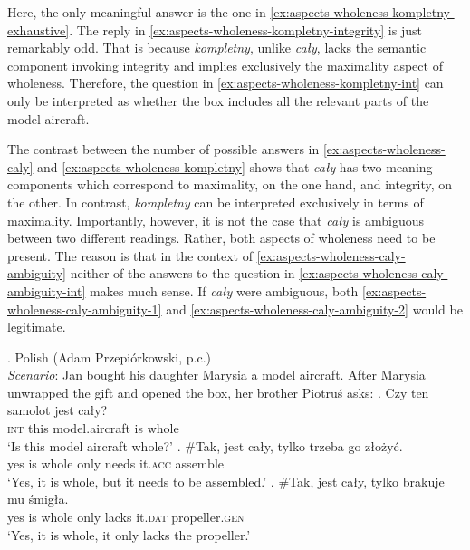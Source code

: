 Here, the only meaningful answer is the one in \ref{ex:aspects-wholeness-kompletny-exhaustive}. The reply in \ref{ex:aspects-wholeness-kompletny-integrity} is just remarkably odd. That is because \textit{kompletny}, unlike \textit{cały}, lacks the semantic component invoking integrity and implies exclusively the maximality aspect of wholeness. Therefore, the question in \ref{ex:aspects-wholeness-kompletny-int} can only be interpreted as whether the box includes all the relevant parts of the model aircraft. 

The contrast between the number of possible answers in \ref{ex:aspects-wholeness-caly} and \ref{ex:aspects-wholeness-kompletny} shows that \textit{cały} has two meaning components which correspond to maximality, on the one hand, and integrity, on the other. In contrast, \textit{kompletny} can be interpreted exclusively in terms of maximality. Importantly, however, it is not the case that \textit{cały} is ambiguous between two different readings. Rather, both aspects of wholeness need to be present. The reason is that in the context of \ref{ex:aspects-wholeness-caly-ambiguity} neither of the answers to the question in \ref{ex:aspects-wholeness-caly-ambiguity-int} makes much sense. If \textit{cały} were ambiguous, both \ref{ex:aspects-wholeness-caly-ambiguity-1} and \ref{ex:aspects-wholeness-caly-ambiguity-2} would be legitimate.

\ex. Polish (Adam Przepiórkowski, p.c.)\\
\textit{Scenario}: Jan bought his daughter Marysia a model aircraft. After Marysia unwrapped the gift and opened the box, her brother Piotruś asks:\label{ex:aspects-wholeness-caly-ambiguity}
\ag. Czy ten samolot jest cały?\label{ex:aspects-wholeness-caly-ambiguity-int}\\
\textsc{int} this model.aircraft is whole\\
`Is this model aircraft whole?'
\bg. \#Tak, jest cały, tylko trzeba go złożyć.\\
yes is whole only needs it\textsc{.acc} assemble\\
`Yes, it is whole, but it needs to be assembled.'\label{ex:aspects-wholeness-caly-ambiguity-1}
\bg. \#Tak, jest cały, tylko brakuje mu śmigła.\\
yes is whole only lacks it\textsc{.dat} propeller\textsc{.gen}\\
`Yes, it is whole, it only lacks the propeller.'\label{ex:aspects-wholeness-caly-ambiguity-2}


